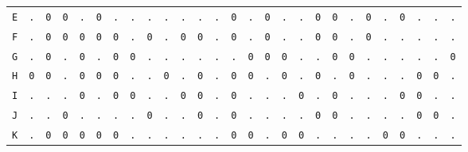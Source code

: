 \begin{figure}[H]
\begin{center}
{\begin{tabular}{c|cccccccccccccccccccccccccc}
				\texttt{E} & \texttt{.} & \texttt{0} & \texttt{0} & \texttt{.} & \texttt{0} & \texttt{.} & \texttt{.} & \texttt{.} & \texttt{.} & \texttt{.} & \texttt{.} & \texttt{.} & \texttt{0} & \texttt{.} & \texttt{0} & \texttt{.} & \texttt{.} & \texttt{0} & \texttt{0} & \texttt{.} & \texttt{0} & \texttt{.} & \texttt{0} & \texttt{.} & \texttt{.} & \texttt{.} \\
				\texttt{F} & \texttt{.} & \texttt{0} & \texttt{0} & \texttt{0} & \texttt{0} & \texttt{0} & \texttt{.} & \texttt{0} & \texttt{.} & \texttt{0} & \texttt{0} & \texttt{.} & \texttt{0} & \texttt{.} & \texttt{0} & \texttt{.} & \texttt{.} & \texttt{0} & \texttt{0} & \texttt{.} & \texttt{0} & \texttt{.} & \texttt{.} & \texttt{.} & \texttt{.} & \texttt{.} \\
				\texttt{G} & \texttt{.} & \texttt{0} & \texttt{.} & \texttt{0} & \texttt{.} & \texttt{0} & \texttt{0} & \texttt{.} & \texttt{.} & \texttt{.} & \texttt{.} & \texttt{.} & \texttt{.} & \texttt{0} & \texttt{0} & \texttt{0} & \texttt{.} & \texttt{.} & \texttt{0} & \texttt{0} & \texttt{.} & \texttt{.} & \texttt{.} & \texttt{.} & \texttt{.} & \texttt{0} \\
				\texttt{H} & \texttt{0} & \texttt{0} & \texttt{.} & \texttt{0} & \texttt{0} & \texttt{0} & \texttt{.} & \texttt{.} & \texttt{0} & \texttt{.} & \texttt{0} & \texttt{.} & \texttt{0} & \texttt{0} & \texttt{.} & \texttt{0} & \texttt{.} & \texttt{0} & \texttt{.} & \texttt{0} & \texttt{.} & \texttt{.} & \texttt{.} & \texttt{0} & \texttt{0} & \texttt{.} \\
				\texttt{I} & \texttt{.} & \texttt{.} & \texttt{.} & \texttt{0} & \texttt{.} & \texttt{0} & \texttt{0} & \texttt{.} & \texttt{.} & \texttt{0} & \texttt{0} & \texttt{.} & \texttt{0} & \texttt{.} & \texttt{.} & \texttt{.} & \texttt{0} & \texttt{.} & \texttt{0} & \texttt{.} & \texttt{.} & \texttt{.} & \texttt{0} & \texttt{0} & \texttt{.} & \texttt{.} \\
				\texttt{J} & \texttt{.} & \texttt{.} & \texttt{0} & \texttt{.} & \texttt{.} & \texttt{.} & \texttt{.} & \texttt{0} & \texttt{.} & \texttt{.} & \texttt{0} & \texttt{.} & \texttt{0} & \texttt{.} & \texttt{.} & \texttt{.} & \texttt{.} & \texttt{0} & \texttt{0} & \texttt{.} & \texttt{.} & \texttt{.} & \texttt{.} & \texttt{0} & \texttt{0} & \texttt{.} \\
				\texttt{K} & \texttt{.} & \texttt{0} & \texttt{0} & \texttt{0} & \texttt{0} & \texttt{0} & \texttt{.} & \texttt{.} & \texttt{.} & \texttt{.} & \texttt{.} & \texttt{.} & \texttt{0} & \texttt{0} & \texttt{.} & \texttt{0} & \texttt{0} & \texttt{.} & \texttt{.} & \texttt{.} & \texttt{.} & \texttt{0} & \texttt{0} & \texttt{.} & \texttt{.} & \texttt{.} \\

\end{tabular}}
\end{center}
\end{figure}
